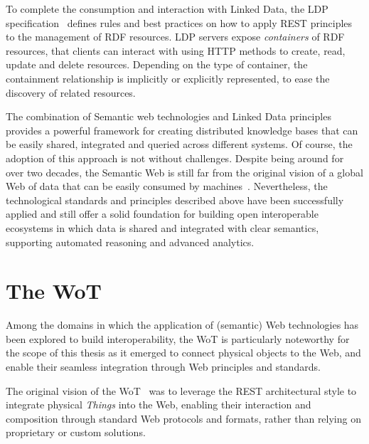 To complete the consumption and interaction with Linked Data, the \ac{LDP} specification~\cite{ldp} defines rules and best practices on how to apply \ac{REST} principles to the management of \ac{RDF} resources.
%
\ac{LDP} servers expose \emph{containers} of \ac{RDF} resources, that clients can interact with using \ac{HTTP} methods to create, read, update and delete resources. Depending on the type of container, the containment relationship is implicitly or explicitly represented, to ease the discovery of related resources.

The combination of Semantic web technologies and Linked Data principles provides a powerful framework for creating distributed knowledge bases that can be easily shared, integrated and queried across different systems.
%
Of course, the adoption of this approach is not without challenges. 
%
Despite being around for over two decades, the Semantic Web is still far from the original vision of a global Web of data that can be easily consumed by machines~\cite{Hogan_2020}. 
%
Nevertheless, the technological standards and principles described above have been successfully applied and still offer a solid foundation for building open interoperable ecosystems in which data is shared and integrated with clear semantics, supporting automated reasoning and advanced analytics.


\section{The \acl{WoT}}

Among the domains in which the application of (semantic) Web technologies has been explored to build interoperability, the \ac{WoT} is particularly noteworthy for the scope of this thesis as it emerged to connect physical objects to the Web, and enable their seamless integration through Web principles and standards.

The original vision of the \ac{WoT}~\cite{Wilde_2007,dguinard:wotMashups:2009} was to leverage the \ac{REST} architectural style to integrate physical \emph{Things} into the Web, enabling their interaction and composition through standard Web protocols and formats, rather than relying on proprietary or custom solutions.

